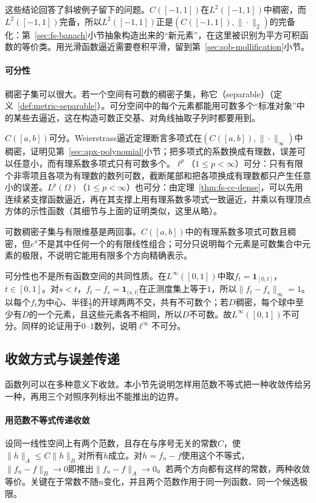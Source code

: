 这些结论回答了斜坡例子留下的问题。$C([-1,1])$在$L^2([-1,1])$中稠密，而$L^2([-1,1])$完备，所以$L^2([-1,1])$正是$(C([-1,1]),\|\cdot\|_2)$的完备化：第~\ref{sec:fs-banach}小节抽象构造出来的“新元素”，在这里被识别为平方可积函数的等价类。用光滑函数逼近需要卷积平滑，留到第~\ref{sec:sob-mollification}小节。

\paragraph{可分性}
稠密子集可以很大。若一个空间有可数的稠密子集，称它（separable）（定义~\ref{def:metric-separable}）。可分空间中的每个元素都能用可数多个“标准对象”中的某些去逼近，这在构造可数正交基、对角线抽取子列时都要用到。

$C([a,b])$可分。Weierstrass逼近定理断言多项式在$(C([a,b]),\|\cdot\|_\infty)$中稠密，证明见第~\ref{sec:apx-polynomial}小节；把多项式的系数换成有理数，误差可以任意小，而有理系数多项式只有可数多个。$\ell^p$（$1\leq p<\infty$）可分：只有有限个非零项且各项为有理数的数列可数，截断尾部和把各项换成有理数都只产生任意小的误差。$L^p(\Omega)$（$1\leq p<\infty$）也可分：由定理~\ref{thm:fs-cc-dense}，可以先用连续紧支撑函数逼近，再在其支撑上用有理系数多项式一致逼近，并乘以有理顶点方体的示性函数（其细节与上面的证明类似，这里从略）。

可数稠密子集与有限维基是两回事。$C([a,b])$中的有理系数多项式可数且稠密，但$e^x$不是其中任何一个的有限线性组合；可分只说明每个元素是可数集合中元素的极限，不说明它能用有限多个方向精确表示。

可分性也不是所有函数空间的共同性质。在$L^\infty([0,1])$中取$f_t=\mathbf 1_{[0,t]}$，$t\in[0,1]$。对$s<t$，$f_t-f_s=\mathbf 1_{(s,t]}$在正测度集上等于$1$，所以$\|f_t-f_s\|_\infty=1$。以每个$f_t$为中心、半径$\tfrac12$的开球两两不交，共有不可数个；若$D$稠密，每个球中至少有$D$的一个元素，且这些元素各不相同，所以$D$不可数。故$L^\infty([0,1])$不可分。同样的论证用于$0$--$1$数列，说明$\ell^\infty$不可分。

\subsection{收敛方式与误差传递}
\label{sec:fs-convergence-modes}

函数列可以在多种意义下收敛。本小节先说明怎样用范数不等式把一种收敛传给另一种，再用三个对照序列标出不能推出的边界。

\paragraph{用范数不等式传递收敛}
设同一线性空间上有两个范数，且存在与序号无关的常数$C$，使$\|h\|_A\leq C\|h\|_B$对所有$h$成立。对$h=f_n-f$使用这个不等式，$\|f_n-f\|_B\to0$即推出$\|f_n-f\|_A\to0$。若两个方向都有这样的常数，两种收敛等价。关键在于常数不随$n$变化，并且两个范数作用于同一列函数、同一个候选极限。


